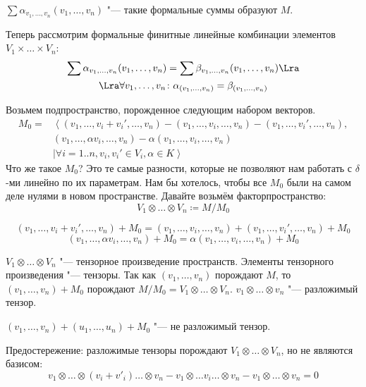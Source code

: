 \begin{description}
	$\sum \alpha_{v_1, \dots, v_n}(v_1, \dots, v_n)$ "--- такие формальные суммы образуют $M$.

	Теперь рассмотрим формальные финитные линейные комбинации элементов $V_1 \times \dots \times V_n$:
	\begin{gather*}
		\sum \alpha_{v_1, \dots, v_n}(v_1, \dots, v_n) = \sum \beta_{v_1, \dots, v_n}(v_1, \dots, v_n) \Lra \\
		\Lra \forall v_1, \dots, v_n \colon \alpha_{(v_1, \dots,  v_n)} = \beta_{(v_1, \dots, v_n)}
	\end{gather*}

	Возьмем подпространство, порожденное следующим набором векторов.
	\begin{align*}
		M_0=& \left< (v_1, \dots, v_i + v_i', \dots, v_n) - (v_1, \dots, v_i, \dots, v_n) - (v_1, \dots, v_i', \dots, v_n), \right.\\
			& (v_1, \dots, \alpha v_i, \dots, v_n) - \alpha(v_1,\dots, v_i, \dots, v_n) \\
			& \mid \left. \forall i = 1..n, v_i, v_i' \in V_i, \alpha \in K \right>
	\end{align*}
	Что же такое $M_0$? Это те самые разности, которые не позволяют нам работать с $\delta$-ми линейно по их параметрам.
	Нам бы хотелось, чтобы все $M_0$ были на самом деле нулями в новом пространстве.
	Давайте возьмём факторпространство:
	\[ V_1 \otimes \dots \otimes V_n \coloneqq M/M_0 \]

	\begin{Rem}
	$$(v_1, \dots, v_i + v_i', \dots, v_n) + M_0 = (v_1, \dots, v_i, \dots, v_n) + (v_1, \dots, v_i',\dots, v_n) + M_0$$
	$$(v_1, \dots, \alpha v_i, \dots, v_n) + M_0 = \alpha(v_1,\dots, v_i, \dots, v_n) + M_0$$
	\end{Rem}

	\begin{Def}
		$V_1 \otimes \dots \otimes V_n$ "--- тензорное произведение пространств.
		Элементы тензорного произведения "--- тензоры.
		Так как  $(v_1, \dots, v_n)$ порождают $M$,
		то $(v_1,\dots, v_n) + M_0$ порождают $M/M_0 = V_1 \otimes \dots \otimes V_n$.
		$v_1 \otimes \dots \otimes v_n$ "--- разложимый тензор.
	\end{Def}
	\begin{exmp}
		$(v_1, \dots, v_n) + (u_1, \dots, u_n) + M_0$ "--- не разложимый тензор.
	\end{exmp}
	Предостережение: разложимые тензоры порождают $V_1 \otimes \dots \otimes V_n$, но не являются базисом:
	\[ v_1 \otimes \dots \otimes (v_i + v'_i) \dots \otimes v_n - v_1 \otimes \dots v_i \dots \otimes v_n - v_1 \otimes \dots \otimes v_n = 0 \]


\end{description}
